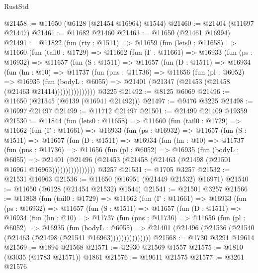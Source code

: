 \begin{lexlean}{RustStd}
\begin{coremodule}
@21458 := @11650 (@6128 (@21454 @16964) @1544)
@21460 := @21404 (@11697 @21447)
@21461 := @11682 @21460
@21463 := @11650 (@21461 @16994)
@21491 := @11822
    (fun (rty : @1511) =>
    @11659
      (fun (lets0 : @11658) =>
      @11660
        (fun (tail0 : @1729) =>
        @11662
          (fun (Γ : @11661) =>
          @16933
            (fun (ps : @16932) =>
            @11657
              (fun (S : @1511) =>
              @11657
                (fun (D : @1511) =>
                @16934
                  (fun (hn : @10) =>
                  @11737
                    (fun (pns : @11736) =>
                    @11656
                      (fun (pl : @6052) =>
                      @16935
                        (fun (bodyL : @6055) =>
                        @21401 (@21347 (@21453 (@21458 (@21463 @21414)))))))))))))))
    @3225
@21492 := @8125 @6069
@21496 := @11650 (@21345 (@6139 (@16941 @21492)))
@21497 := @9476 @3225
@21498 := @16997 @21497
@21499 := @11712 @21497
@21501 := @21499 @21409 @19359
@21530 := @11844
    (fun (lets0 : @11658) =>
    @11660
      (fun (tail0 : @1729) =>
      @11662
        (fun (Γ : @11661) =>
        @16933
          (fun (ps : @16932) =>
          @11657
            (fun (S : @1511) =>
            @11657
              (fun (D : @1511) =>
              @16934
                (fun (hn : @10) =>
                @11737
                  (fun (pns : @11736) =>
                  @11656
                    (fun (pl : @6052) =>
                    @16935
                      (fun (bodyL : @6055) =>
                      @21401
                        (@21496
                          (@21453 (@21458 (@21463 (@21498 (@21501 @16961 @16963))))))))))))))))
    @3257
@21531 := @1705 @3257
@21532 := @21531 @16963
@21536 := @11650 (@16951 (@21449 @21532) @16971)
@21540 := @11650 (@6128 (@21454 @21532) @1544)
@21541 := @21501 @3257
@21566 := @11868
    (fun (tail0 : @1729) =>
    @11662
      (fun (Γ : @11661) =>
      @16933
        (fun (ps : @16932) =>
        @11657
          (fun (S : @1511) =>
          @11657
            (fun (D : @1511) =>
            @16934
              (fun (hn : @10) =>
              @11737
                (fun (pns : @11736) =>
                @11656
                  (fun (pl : @6052) =>
                  @16935
                    (fun (bodyL : @6055) =>
                    @21401 (@21496 (@21536 (@21540 (@21463 (@21498 (@21541 @16963)))))))))))))))
@21568 := @1730 @3291 @19614
@21569 := @1894 @21568
@21571 := @2930 @21569 @1557
@21575 := @1810 (@3035 (@1783 @21571)) @1861
@21576 := @19611 @21575
@21577 := @3261 @21576

\end{coremodule}
\end{lexlean}
